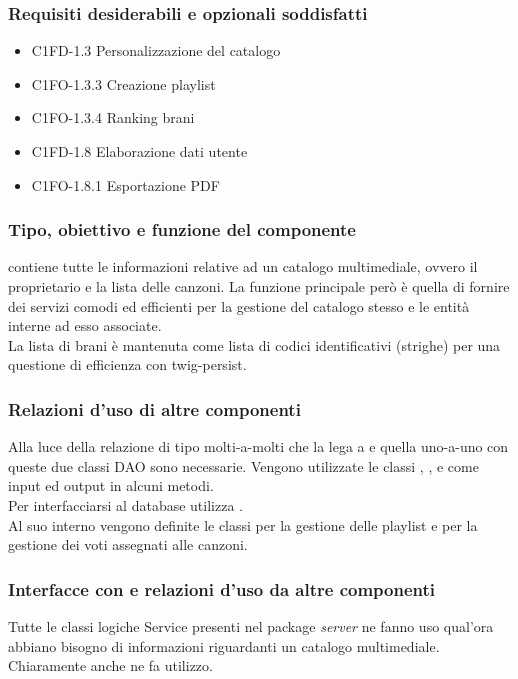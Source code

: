 \subsubsection*{Requisiti desiderabili e opzionali soddisfatti}
\begin{itemize}
    \item C1FD-1.3 Personalizzazione del catalogo
    \item C1FO-1.3.3 Creazione playlist 
    \item C1FO-1.3.4 Ranking brani
    \item C1FD-1.8 Elaborazione dati utente
    \item C1FO-1.8.1 Esportazione PDF
\end{itemize}
\subsubsection*{Tipo, obiettivo e funzione del componente} 
contiene tutte le informazioni relative ad un catalogo multimediale, ovvero
il proprietario e la lista delle canzoni. La funzione principale per\`o \`e
quella di fornire dei servizi comodi ed efficienti per la gestione del catalogo
stesso e le entit\`a interne ad esso associate.\\
La lista di brani \`e mantenuta
come lista di codici identificativi (strighe) per una questione di efficienza
con twig-persist. \subsubsection*{Relazioni d'uso di altre componenti}
Alla luce della relazione di tipo molti-a-molti che la lega a  e quella
uno-a-uno con  queste due classi DAO sono necessarie. Vengono
utilizzate le classi , ,
 e  come input ed output in alcuni metodi.\\ Per
interfacciarsi al database utilizza .\\ 
Al suo interno vengono definite le classi  per la gestione delle
playlist e  per la gestione dei voti assegnati alle canzoni.
\subsubsection*{Interfacce con e
relazioni d'uso da altre componenti} Tutte le classi logiche Service presenti nel package
\emph{server} ne fanno uso qual'ora abbiano bisogno di informazioni riguardanti
un catalogo multimediale. Chiaramente anche  ne fa utilizzo.

